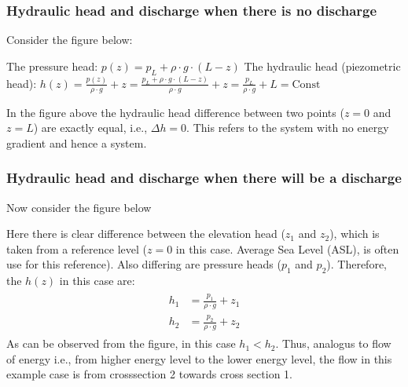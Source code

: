 \documentclass[letterpaper,10pt,english]{sphinxmanual}
\let\sphinxpxdimen\pdfpxdimen\else\newdimen\sphinxpxdimen
\begin{document}
\subsubsection{Hydraulic head and discharge \sphinxhyphen{} when there is no discharge}
\label{\detokenize{contents/flow/lecture_04/14_darcy_law_K:hydraulic-head-and-discharge-when-there-is-no-discharge}}
Consider the figure below:

\noindent\sphinxincludegraphics[width=600\sphinxpxdimen]{{L4_f1}.png}

The pressure head: \(p(z) = p_L + \rho \cdot g \cdot (L-z)\) 
The hydraulic head (piezometric head): \(h(z) = \frac{p(z)}{\rho \cdot g } + z = \frac{p_L + \rho \cdot g \cdot (L-z) }{\rho \cdot g } + z = \frac{p_L}{\rho \cdot g}+ L = \text{Const}\)

In the figure above the hydraulic head difference between two points (\(z=0\) and \(z=L\)) are exactly equal, i.e., \(\Delta h = 0\). This refers to the system with no energy gradient and hence a  system.


\subsubsection{Hydraulic head and discharge \sphinxhyphen{} when there will be a discharge}
\label{\detokenize{contents/flow/lecture_04/14_darcy_law_K:hydraulic-head-and-discharge-when-there-will-be-a-discharge}}
Now consider the figure below

\noindent\sphinxincludegraphics[width=400\sphinxpxdimen]{{L4_f2}.png}

Here there is clear difference between the elevation head (\(z_1\) and \(z_2\)), which is taken from a reference level (\(z=0\) in this case. Average Sea Level (ASL), is often use for this reference). Also differing are pressure heads (\(p_1\) and \(p_2\)). Therefore, the \(h(z)\) in this case are:
\begin{equation*}
\begin{split}
\begin{align}
h_1 &= \frac{p_1}{\rho \cdot g} + z_1 \\
h_2 &= \frac{p_2}{\rho \cdot g} + z_2
\end{align}
\end{split}
\end{equation*}
As can be observed from the figure, in this case \(h_1<h_2\). Thus, analogus to flow of energy \sphinxhyphen{} i.e., from higher energy level to the lower energy level, the flow in this example case is from cross\sphinxhyphen{}section 2 towards cross section 1.
\end{document}
